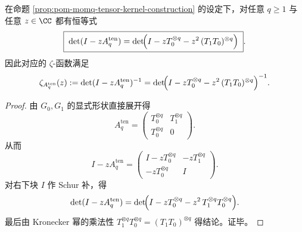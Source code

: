 \begin{proposition}\label{prop:pom-momq-tensor-kernel-schur-determinant}
在命题 \ref{prop:pom-momq-tensor-kernel-construction} 的设定下，对任意 \(q\ge 1\) 与任意 \(z\in\CC\) 都有恒等式
\[
\boxed{\;
\det(I-zA_q^{\mathrm{ten}})
=\det\!\Bigl(I-zT_0^{\otimes q}-z^2\,(T_1T_0)^{\otimes q}\Bigr)\; }.
\]
因此对应的 \(\zeta\)-函数满足
\[
\zeta_{A_q^{\mathrm{ten}}}(z)
:=\det(I-zA_q^{\mathrm{ten}})^{-1}
=\det\!\Bigl(I-zT_0^{\otimes q}-z^2\,(T_1T_0)^{\otimes q}\Bigr)^{-1}.
\]
\end{proposition}
\begin{proof}
由 \(G_0,G_1\) 的显式形状直接展开得
\[
A_q^{\mathrm{ten}}
=
\begin{pmatrix}
T_0^{\otimes q} & T_1^{\otimes q}\\[2pt]
T_0^{\otimes q} & 0
\end{pmatrix}.
\]
从而
\[
I-zA_q^{\mathrm{ten}}
=
\begin{pmatrix}
I-zT_0^{\otimes q} & -zT_1^{\otimes q}\\[2pt]
-zT_0^{\otimes q} & I
\end{pmatrix}.
\]
对右下块 \(I\) 作 Schur 补，得
\[
\det(I-zA_q^{\mathrm{ten}})
=\det\!\Bigl(I-zT_0^{\otimes q}-z^2\,T_1^{\otimes q}T_0^{\otimes q}\Bigr).
\]
最后由 Kronecker 幂的乘法性 \(T_1^{\otimes q}T_0^{\otimes q}=(T_1T_0)^{\otimes q}\) 得结论。证毕。
\end{proof}

